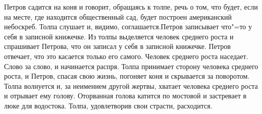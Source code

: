 Петров садится на коня и говорит, обращаясь к толпе, речь о том, что будет,
если на месте, где находится общественный сад, будет построен американский небоскреб.
Толпа слушает и, видимо, соглашается.Петров записывает что"=то у себя в записной книжечке.
Из толпы выделяется человек среднего роста и спрашивает Петрова, что он записал у  себя в записной книжечке.
Петров отвечает, что это касается только его самого.
Человек среднего роста наседает. Слово за слово, и начинается распря.
Толпа  принимает  сторону  человека среднего роста, и Петров, спасая свою жизнь, погоняет коня и скрывается за поворотом.
Толпа волнуется и, за неимением  другой жертвы, хватает человека среднего роста и отрывает ему голову.
Оторванная голова катится по мостовой и застревает в люке для водостока.
Толпа, удовлетворив свои страсти, расходится.
